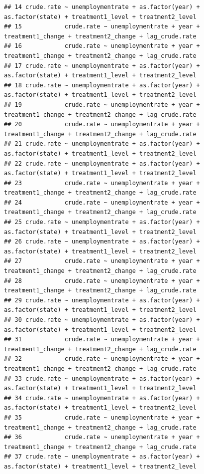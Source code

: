 \documentclass[
]{article}
\begin{document}
\begin{verbatim}
## 14 crude.rate ~ unemploymentrate + as.factor(year) + as.factor(state) + treatment1_level + treatment2_level
## 15            crude.rate ~ unemploymentrate + year + treatment1_change + treatment2_change + lag_crude.rate
## 16            crude.rate ~ unemploymentrate + year + treatment1_change + treatment2_change + lag_crude.rate
## 17 crude.rate ~ unemploymentrate + as.factor(year) + as.factor(state) + treatment1_level + treatment2_level
## 18 crude.rate ~ unemploymentrate + as.factor(year) + as.factor(state) + treatment1_level + treatment2_level
## 19            crude.rate ~ unemploymentrate + year + treatment1_change + treatment2_change + lag_crude.rate
## 20            crude.rate ~ unemploymentrate + year + treatment1_change + treatment2_change + lag_crude.rate
## 21 crude.rate ~ unemploymentrate + as.factor(year) + as.factor(state) + treatment1_level + treatment2_level
## 22 crude.rate ~ unemploymentrate + as.factor(year) + as.factor(state) + treatment1_level + treatment2_level
## 23            crude.rate ~ unemploymentrate + year + treatment1_change + treatment2_change + lag_crude.rate
## 24            crude.rate ~ unemploymentrate + year + treatment1_change + treatment2_change + lag_crude.rate
## 25 crude.rate ~ unemploymentrate + as.factor(year) + as.factor(state) + treatment1_level + treatment2_level
## 26 crude.rate ~ unemploymentrate + as.factor(year) + as.factor(state) + treatment1_level + treatment2_level
## 27            crude.rate ~ unemploymentrate + year + treatment1_change + treatment2_change + lag_crude.rate
## 28            crude.rate ~ unemploymentrate + year + treatment1_change + treatment2_change + lag_crude.rate
## 29 crude.rate ~ unemploymentrate + as.factor(year) + as.factor(state) + treatment1_level + treatment2_level
## 30 crude.rate ~ unemploymentrate + as.factor(year) + as.factor(state) + treatment1_level + treatment2_level
## 31            crude.rate ~ unemploymentrate + year + treatment1_change + treatment2_change + lag_crude.rate
## 32            crude.rate ~ unemploymentrate + year + treatment1_change + treatment2_change + lag_crude.rate
## 33 crude.rate ~ unemploymentrate + as.factor(year) + as.factor(state) + treatment1_level + treatment2_level
## 34 crude.rate ~ unemploymentrate + as.factor(year) + as.factor(state) + treatment1_level + treatment2_level
## 35            crude.rate ~ unemploymentrate + year + treatment1_change + treatment2_change + lag_crude.rate
## 36            crude.rate ~ unemploymentrate + year + treatment1_change + treatment2_change + lag_crude.rate
## 37 crude.rate ~ unemploymentrate + as.factor(year) + as.factor(state) + treatment1_level + treatment2_level

\end{verbatim}
\end{document}
